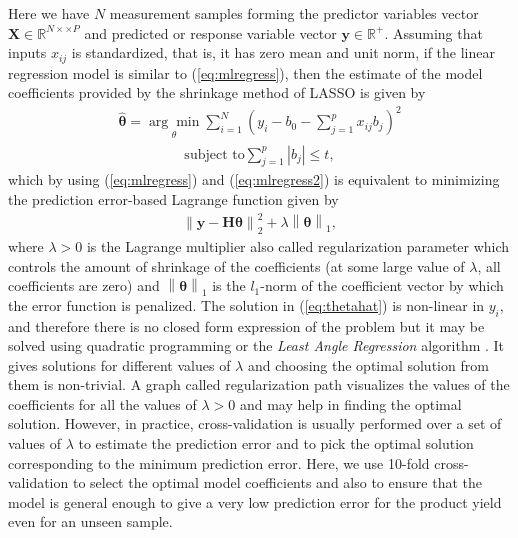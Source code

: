 \documentclass{article}
\begin{document}
Here we have $N$ measurement samples forming the predictor variables vector $\mathbf{X}\in \mathbb{R}^{N\times×P}$ and predicted or response variable vector $\mathbf{y}\in \mathbb{R}^{+}$. Assuming that inputs $x_{ij}$ is standardized, that is, it has zero mean and unit norm, if the linear regression model is similar to (\ref{eq:mlregress}), then the estimate of the model coefficients provided by the shrinkage method of LASSO is given by
\vspace{-2mm}                 
\begin{align}\label{eq:thetahat}
	\hat{\boldsymbol{\theta}} = \underset{\theta}{\arg\min} \displaystyle\sum_{i=1}^{N} (y_i - b_0 - \sum_{j=1}^{p} x_{ij} b_j)^2 
\end{align}   
\vspace{-5mm}                 
\begin{align}
	\textrm{subject to} \sum_{j=1}^{p}|b_j| \leq t, \nonumber
\end{align}                                                                                  
which by using (\ref{eq:mlregress}) and (\ref{eq:mlregress2}) is equivalent to minimizing the prediction error-based Lagrange function given by
\begin{align}\label{eq:lasso}
	\left\|\mathbf{y}- \mathbf{H}\boldsymbol{\theta}\right\|_{2}^{2}  + \lambda \left\|\boldsymbol{\theta}\right\|_{1},
\end{align}
where $\lambda > 0$ is the Lagrange multiplier also called regularization parameter which controls the amount of shrinkage of the coefficients (at some large value of $\lambda$, all coefficients are zero) and $\left\|\boldsymbol{\theta}\right\|_{1}$ is the $l_1$-norm of the coefficient vector by which the error function is penalized. The solution in (\ref{eq:thetahat}) is non-linear in $y_i$, and therefore there is no closed form expression of the problem but it may be solved using quadratic programming or the \textit{Least Angle Regression} algorithm \cite{ScaleUp_MLSP:efron04, ScaleUp_MLSP:hastie09}. It gives solutions for different values of $\lambda$ and choosing the optimal solution from them is non-trivial. A graph called regularization path visualizes the values of the coefficients for all the values of $\lambda > 0$ and may help in finding the optimal solution. However, in practice, cross-validation is usually performed over a set of values of $\lambda$ to estimate the prediction error and to pick the optimal solution corresponding to the minimum prediction error. Here, we use 10-fold cross-validation to select the optimal model coefficients and also to ensure that the model is general enough to give a very low prediction error for the product yield even for an unseen sample.
\end{document}
